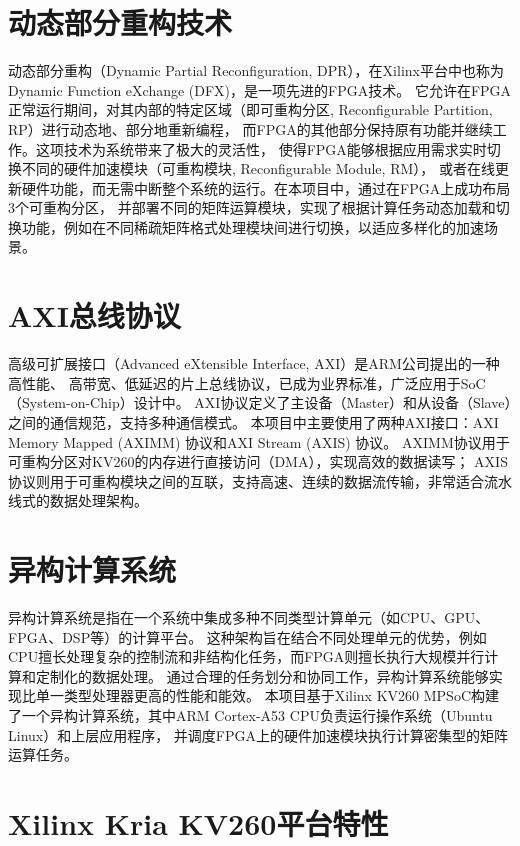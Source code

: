 \section{动态部分重构技术}

动态部分重构（Dynamic Partial Reconfiguration, DPR），在Xilinx平台中也称为Dynamic Function eXchange (DFX)，是一项先进的FPGA技术。
它允许在FPGA正常运行期间，对其内部的特定区域（即可重构分区, Reconfigurable Partition, RP）进行动态地、部分地重新编程，
而FPGA的其他部分保持原有功能并继续工作。这项技术为系统带来了极大的灵活性，
使得FPGA能够根据应用需求实时切换不同的硬件加速模块（可重构模块, Reconfigurable Module, RM），
或者在线更新硬件功能，而无需中断整个系统的运行。在本项目中，通过在FPGA上成功布局3个可重构分区，
并部署不同的矩阵运算模块，实现了根据计算任务动态加载和切换功能，例如在不同稀疏矩阵格式处理模块间进行切换，以适应多样化的加速场景。

\section{AXI总线协议}

高级可扩展接口（Advanced eXtensible Interface, AXI）是ARM公司提出的一种高性能、
高带宽、低延迟的片上总线协议，已成为业界标准，广泛应用于SoC（System-on-Chip）设计中。
AXI协议定义了主设备（Master）和从设备（Slave）之间的通信规范，支持多种通信模式。
本项目中主要使用了两种AXI接口：AXI Memory Mapped (AXIMM) 协议和AXI Stream (AXIS) 协议。
AXIMM协议用于可重构分区对KV260的内存进行直接访问（DMA），实现高效的数据读写；
AXIS协议则用于可重构模块之间的互联，支持高速、连续的数据流传输，非常适合流水线式的数据处理架构。

\section{异构计算系统}

异构计算系统是指在一个系统中集成多种不同类型计算单元（如CPU、GPU、FPGA、DSP等）的计算平台。
这种架构旨在结合不同处理单元的优势，例如CPU擅长处理复杂的控制流和非结构化任务，而FPGA则擅长执行大规模并行计算和定制化的数据处理。
通过合理的任务划分和协同工作，异构计算系统能够实现比单一类型处理器更高的性能和能效。
本项目基于Xilinx KV260 MPSoC构建了一个异构计算系统，其中ARM Cortex-A53 CPU负责运行操作系统（Ubuntu Linux）和上层应用程序，
并调度FPGA上的硬件加速模块执行计算密集型的矩阵运算任务。

\section{Xilinx Kria KV260平台特性}

